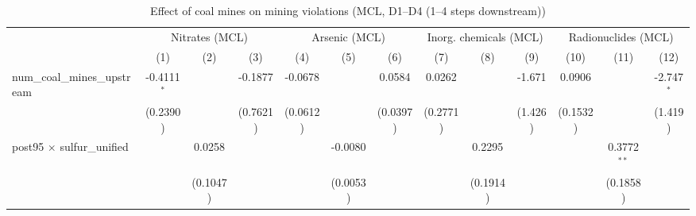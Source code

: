 
\begin{table}[htbp]
   
   \caption{\label{2sls_4step_d1_d4_minevio_mcl} Effect of coal mines on mining violations (MCL, D1--D4 (1--4 steps downstream))}
   \bigskip
   
   \centering
   
   \begin{adjustbox}{width = \textwidth, center}
      
      
      \begin{tabular}{lcccccccccccc}
         \toprule
         
          & \multicolumn{3}{c}{Nitrates (MCL)} & \multicolumn{3}{c}{Arsenic (MCL)} & \multicolumn{3}{c}{Inorg. chemicals (MCL)} & \multicolumn{3}{c}{Radionuclides (MCL)}\\
         
                                                           & (1)           & (2)           & (3)           & (4)           & (5)                   & (6)                   & (7)                   & (8)           & (9)           & (10)                  & (11)          & (12)\\  
         
         \midrule 
         num\_coal\_mines\_upstream                        & -0.4111$^{*}$ &               & -0.1877       & -0.0678       &                       & 0.0584                & 0.0262                &               & -1.671        & 0.0906                &               & -2.747$^{*}$\\   
                                                           & (0.2390)      &               & (0.7621)      & (0.0612)      &                       & (0.0397)              & (0.2771)              &               & (1.426)       & (0.1532)              &               & (1.419)\\   
         post95 $\times$ sulfur\_unified                   &               & 0.0258        &               &               & -0.0080               &                       &                       & 0.2295        &               &                       & 0.3772$^{**}$ &   \\   
                                                           &               & (0.1047)      &               &               & (0.0053)              &                       &                       & (0.1914)      &               &                       & (0.1858)      &   \\   
         

\end{tabular}
\end{adjustbox}
\end{table}
